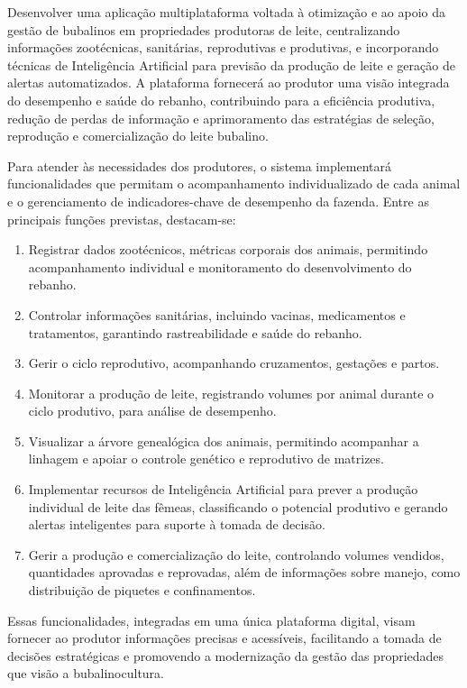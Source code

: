 Desenvolver uma aplicação multiplataforma voltada à otimização e ao apoio da gestão de bubalinos em propriedades produtoras de leite, centralizando informações zootécnicas, sanitárias, reprodutivas e produtivas, e incorporando técnicas de Inteligência Artificial para previsão da produção de leite e geração de alertas automatizados. A plataforma fornecerá ao produtor uma visão integrada do desempenho e saúde do rebanho, contribuindo para a eficiência produtiva, redução de perdas de informação e aprimoramento das estratégias de seleção, reprodução e comercialização do leite bubalino.

Para atender às necessidades dos produtores, o sistema implementará funcionalidades que permitam o acompanhamento individualizado de cada animal e o gerenciamento de indicadores-chave de desempenho da fazenda. Entre as principais funções previstas, destacam-se:

\begin{enumerate}
    \item Registrar dados zootécnicos, métricas corporais dos animais, permitindo acompanhamento individual e monitoramento do desenvolvimento do rebanho.
    \item Controlar informações sanitárias, incluindo vacinas, medicamentos e tratamentos, garantindo rastreabilidade e saúde do rebanho.
    \item Gerir o ciclo reprodutivo, acompanhando cruzamentos, gestações e partos.
    \item Monitorar a produção de leite, registrando volumes por animal durante o ciclo produtivo, para análise de desempenho.
    \item Visualizar a árvore genealógica dos animais, permitindo acompanhar a linhagem e apoiar o controle genético e reprodutivo de matrizes.
    \item Implementar recursos de Inteligência Artificial para prever a produção individual de leite das fêmeas, classificando o potencial produtivo e gerando alertas inteligentes para suporte à tomada de decisão.
    \item Gerir a produção e comercialização do leite, controlando volumes vendidos, quantidades aprovadas e reprovadas, além de informações sobre manejo, como distribuição de piquetes e confinamentos.
\end{enumerate}


Essas funcionalidades, integradas em uma única plataforma digital, visam fornecer ao produtor informações precisas e acessíveis, facilitando a tomada de decisões estratégicas e promovendo a modernização da gestão das propriedades que visão a bubalinocultura.